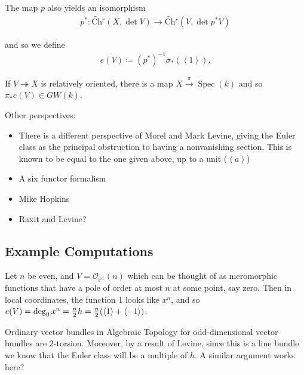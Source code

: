 The map \(p\) also yields an isomorphism
\begin{align*}
p^*: \widetilde{\text{Ch}}{}^r(X, \det V) \to \widetilde{\text{Ch}}{}^r(V, \det p^* V)
\end{align*}

and so we define
\begin{align*}
e(V) \coloneqq(p^*)^{-1}\sigma_*(\left\langle{1}\right\rangle).
\end{align*}

If \(V \twoheadrightarrow X\) is relatively oriented, there is a map
\(X \xrightarrow{\pi }\operatorname{Spec}(k)\) and so
\(\pi_* e(V) \in GW(k)\).

Other perspectives:

\begin{itemize}
\tightlist
\item
  There is a different perspective of Morel and Mark Levine, giving the
  Euler class as the principal obstruction to having a nonvanishing
  section. This is known to be equal to the one given above, up to a
  unit (\(\left\langle{a}\right\rangle\))
\item
  A six functor formalism
\item
  Mike Hopkins
\item
  Raxit and Levine?
\end{itemize}

\hypertarget{example-computations}{%
\subsection{Example Computations}\label{example-computations}}

\begin{example}[?]

Let \(n\) be even, and \(V = {\mathcal{O}}_{{\mathbb{P}}^1}(n)\) which
can be thought of as meromorphic functions that have a pole of order at
most \(n\) at some point, say zero. Then in local coordinates, the
function 1 looks like \(x^n\), and so
\(e(V) = \deg_0 x^n = {n\over 2} h = {n\over 2}(\left\langle{1}\right\rangle + \left\langle{-1}\right\rangle)\).

\end{example}

\begin{remark}

Ordinary vector bundles in Algebraic Topology for odd-dimensional vector
bundles are 2-torsion. Moreover, by a result of Levine, since this is a
line bundle we know that the Euler class will be a multiple of \(h\). A
similar argument works here?

\end{remark}

